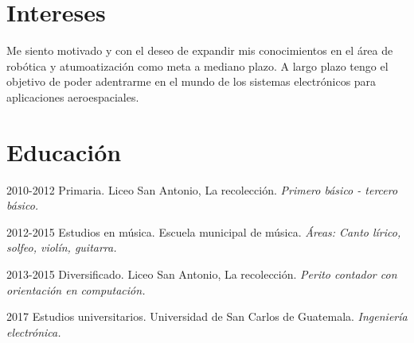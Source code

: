 \documentclass[]{twentysecondcv}
\begin{document}
{%
\section{Intereses}
Me siento motivado y con el deseo de expandir mis conocimientos en el \'area de rob\'otica y atumoatizaci\'on como meta a mediano plazo. A largo plazo tengo el objetivo de poder adentrarme en el mundo de los sistemas electr\'onicos para aplicaciones aeroespaciales.
\section{Educaci\'on}

\begin{twenty}
  
  \twentyitem 
    {2010-2012}
    {{\normalfont Primaria.}}    
    {Liceo San Antonio, La recolecci\'on.}
    {\emph{Primero b\'asico - tercero b\'asico.}}
    
  \twentyitem 
    {2012-2015}
    {{\normalfont Estudios en m\'usica.}}
    {Escuela municipal de m\'usica.}
    {\emph{\'Areas: Canto l\'irico, solfeo, viol\'in, guitarra.}}  
    
  \twentyitem
    {2013-2015}
    {{\normalfont Diversificado.}}
    {Liceo San Antonio, La recolecci\'on.}
    {\emph{Perito contador con orientaci\'on en computaci\'on.}}

  \twentyitem
    {2017}
    {Estudios universitarios.}
    {Universidad de San Carlos de Guatemala.}
    {\emph{Ingenier\'ia electr\'onica.}}
    
\end{twenty}



}
\end{document}
